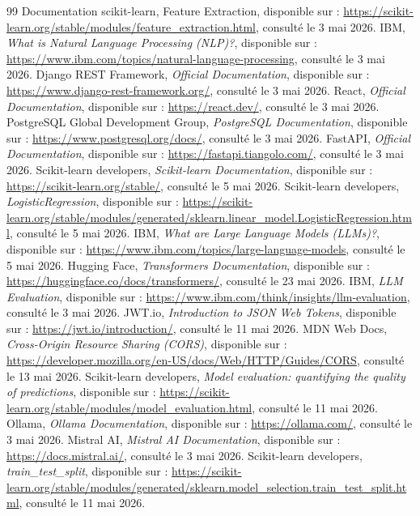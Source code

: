 \documentclass[12pt,a4paper,oneside]{report}
\begin{document}
\begin{thebibliography}{99}
Documentation scikit-learn, Feature Extraction, disponible sur : \url{https://scikit-learn.org/stable/modules/feature_extraction.html}, consulté le 3 mai 2026.
IBM, \textit{What is Natural Language Processing (NLP)?}, disponible sur : \url{https://www.ibm.com/topics/natural-language-processing}, consulté le 3 mai 2026.
Django REST Framework, \textit{Official Documentation}, disponible sur : \url{https://www.django-rest-framework.org/}, consulté le 3 mai 2026.
React, \textit{Official Documentation}, disponible sur : \url{https://react.dev/}, consulté le 3 mai 2026.
PostgreSQL Global Development Group, \textit{PostgreSQL Documentation}, disponible sur : \url{https://www.postgresql.org/docs/}, consulté le 3 mai 2026.
FastAPI, \textit{Official Documentation}, disponible sur : \url{https://fastapi.tiangolo.com/}, consulté le 3 mai 2026.
Scikit-learn developers, \textit{Scikit-learn Documentation}, disponible sur : \url{https://scikit-learn.org/stable/}, consulté le 5 mai 2026.
Scikit-learn developers, \textit{LogisticRegression}, disponible sur : \url{https://scikit-learn.org/stable/modules/generated/sklearn.linear_model.LogisticRegression.html}, consulté le 5 mai 2026.
IBM, \textit{What are Large Language Models (LLMs)?}, disponible sur : \url{https://www.ibm.com/topics/large-language-models}, consulté le 5 mai 2026.
Hugging Face, \textit{Transformers Documentation}, disponible sur : \url{https://huggingface.co/docs/transformers/}, consulté le 23 mai 2026.
IBM, \textit{LLM Evaluation}, disponible sur : \url{https://www.ibm.com/think/insights/llm-evaluation}, consulté le 3 mai 2026.
JWT.io, \textit{Introduction to JSON Web Tokens}, disponible sur : \url{https://jwt.io/introduction/}, consulté le 11 mai 2026.
MDN Web Docs, \textit{Cross-Origin Resource Sharing (CORS)}, disponible sur : \url{https://developer.mozilla.org/en-US/docs/Web/HTTP/Guides/CORS}, consulté le 13 mai 2026.
Scikit-learn developers, \textit{Model evaluation: quantifying the quality of predictions}, disponible sur : \url{https://scikit-learn.org/stable/modules/model_evaluation.html}, consulté le 11 mai 2026.
Ollama, \textit{Ollama Documentation}, disponible sur : \url{https://ollama.com/}, consulté le 3 mai 2026.
Mistral AI, \textit{Mistral AI Documentation}, disponible sur : \url{https://docs.mistral.ai/}, consulté le 3 mai 2026.
Scikit-learn developers, \textit{train\_test\_split}, disponible sur : \url{https://scikit-learn.org/stable/modules/generated/sklearn.model_selection.train_test_split.html}, consulté le 11 mai 2026.
\end{thebibliography}
\end{document}
